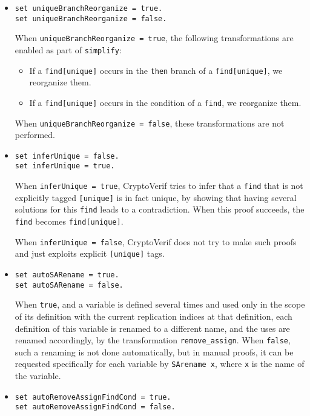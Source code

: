 \begin{itemize}
\begin{itemize}
\item \texttt{set uniqueBranchReorganize = true.}\\
\texttt{set uniqueBranchReorganize = false.}

When {\tt uniqueBranchReorganize = true}, the following transformations are 
enabled as part of {\tt simplify}:
\begin{itemize}
\item
If a {\tt find[unique]} occurs in the {\tt then} branch 
of a {\tt find[unique]}, we reorganize them.

\item 
If a {\tt find[unique]} occurs in the condition of a {\tt find}, 
we reorganize them.

\end{itemize}
When {\tt uniqueBranchReorganize = false}, these transformations are not performed. 

\item \texttt{set inferUnique = false.}\\
\texttt{set inferUnique = true.}

When \texttt{inferUnique = true}, CryptoVerif tries to infer
that a \texttt{find} that is not explicitly tagged \texttt{[unique]}
is in fact unique, by showing that having several solutions
for this \texttt{find} leads to a contradiction.
When this proof succeeds, the \texttt{find} becomes {\tt find[unique]}.

When \texttt{inferUnique = false}, CryptoVerif does not try to
make such proofs and just exploits explicit \texttt{[unique]} tags.

\item \texttt{set autoSARename = true.}\\
\texttt{set autoSARename = false.}

When {\tt true}, and a variable is defined several times and
used only in the scope of its definition with the current
replication indices at that definition, each definition of
this variable is renamed to a different name, and the uses
are renamed accordingly, by the transformation {\tt remove\string_assign}.
When {\tt false}, such a renaming is not done automatically,
but in manual proofs, it can be requested specifically for each 
variable by {\tt SArename x}, where {\tt x} is the name of the variable.

\item \texttt{set autoRemoveAssignFindCond = true.}\\
\texttt{set autoRemoveAssignFindCond = false.}


\end{itemize}
\end{itemize}
